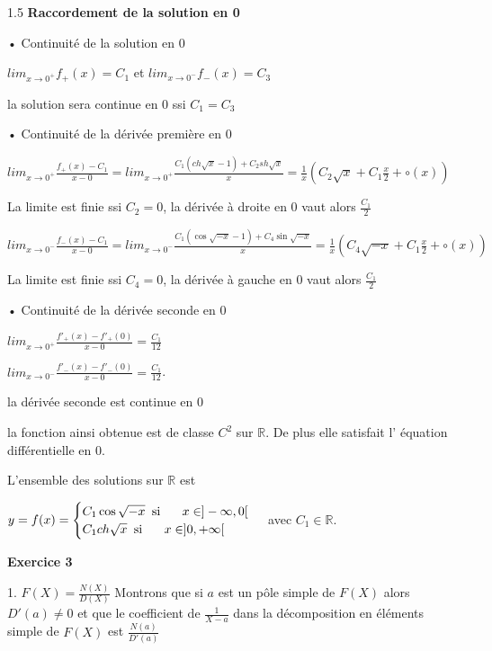 \documentclass[12pt]{article}
\begin{document}
\begin{spacing}{1.5}
\vspace{1cm}
\textbf{Raccordement de la solution en 0}

• Continuité de la solution en 0

$lim_{x\longrightarrow 0^+}f_{+}(x) = C_1$ et $lim_{x\longrightarrow 0^-} f_{-}(x) = C_3$

la solution sera continue en 0 ssi $C_1 = C_3$

• Continuité de la dérivée première en 0

$lim_{x\longrightarrow 0^+}\frac{f_+(x)-C_1}{x-0}=lim_{x\longrightarrow 0^+}\frac{C_1(ch\sqrt{x}-1)+C_2sh\sqrt{x}}{x}=\frac{1}{x}(C_2\sqrt{x}+C_1\frac{x}{2}+\circ(x))$

La limite est finie ssi $C_2 = 0$, la dérivée à droite en 0 vaut alors $\frac{C_1}{2}$

\vspace{0.5cm}
$lim_{x\longrightarrow 0^-}\frac{f_-(x)-C_1}{x-0}=lim_{x\longrightarrow 0^-}\frac{C_1(\cos\sqrt{-x}-1)+C_4\sin\sqrt{-x}}{x}=\frac{1}{x}(C_4\sqrt{-x}+C_1\frac{x}{2}+\circ(x))$

La limite est finie ssi $C_4 = 0$, la dérivée à gauche en 0 vaut alors $\frac{C_1}{2}$

• Continuité de la dérivée seconde en 0

$lim_{x\to 0^+}\frac{f'_+(x)-f'_+(0)}{x-0}=\frac{C_1}{12}$

$lim_{x\to 0^-}\frac{f'_-(x)-f'_-(0)}{x-0}=\frac{C_1}{12}$.

la dérivée seconde est continue en 0
 
 \vspace{1cm}
la fonction ainsi obtenue est de classe $C^2$ sur $\mathbb{R}$. De plus elle satisfait l' équation différentielle en 0.

L'ensemble des solutions sur $\mathbb{R}$ est

$y = f(x) = \begin{cases}
C_1\cos\sqrt{-x}\hspace{0.07cm} \text{ si } \hspace{0.5cm} x\in ]-\infty,0[\\
C_1ch\sqrt{x}\hspace{0.07cm}  \text{ si } \hspace{0.5cm} x\in ]0, +\infty[
\end{cases}$ avec $C_1\in \mathbb{R}$.

\medskip\textbf{Exercice 3}

1. $F(X)=\frac{N(X)}{D(X)}$ Montrons que si $a$ est un pôle simple de $F(X)$ alors $D'(a)\neq 0$ et que le coefficient de $\frac{1}{X-a}$ dans la décomposition en éléments simple de $F(X)$ est $\frac{N(a)}{D'(a)}$


\end{spacing}
\end{document}
